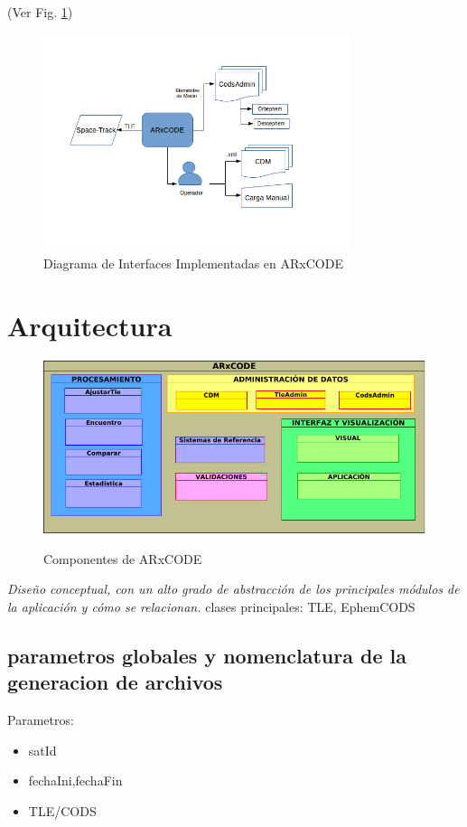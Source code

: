(Ver Fig. \ref{fig:interfacesImpl})

\begin{figure}
\centering
  \includegraphics[width=0.8\textwidth]{imagenes/interfazImplementada}
  \caption[Diagrama de Interfaces Implementadas en ARxCODE]{Diagrama de Interfaces Implementadas en ARxCODE}
  \label{fig:interfacesImpl}
\end{figure}

\section{Arquitectura}
\begin{figure}[h!]
  \centering
  \includegraphics[width=.8\textwidth]{imagenes/componentesAR}
  \label{fig:componentes}
  \caption{Componentes de ARxCODE}
\end{figure}

{\it{Dise\~no conceptual, con un alto grado de abstracci\'on de los principales m\'odulos de la aplicaci\'on y c\'omo se relacionan.}}
clases principales: TLE, EphemCODS
\subsection*{parametros globales y nomenclatura de la generacion de archivos}
Parametros:\\
\begin{itemize}
 \item satId
 \item fechaIni,fechaFin
 \item TLE/CODS
\end{itemize}


